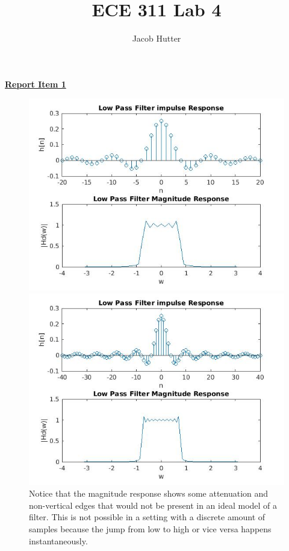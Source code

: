 \documentclass{article}
\author{Jacob Hutter}
\title{ECE 311 Lab 4}
\begin{document}
\maketitle
\color{red}
\underline{\textbf{Report Item 1}}
\color{black}

\begin{figure}[H]
\includegraphics[scale = .5]{1_lpf_20}
\includegraphics[scale = .5]{1_lpf_40}
\\ Notice that the magnitude response shows some attenuation and non-vertical edges that would not be present in an ideal model of a filter. This is not possible in a setting with a discrete amount of samples because the jump from low to high or vice versa happens instantaneously.
\end{figure}
\end{document}
